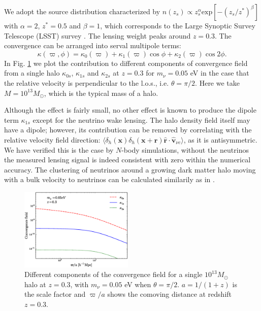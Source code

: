 \documentclass[aps,prl,twocolumn,showpacs,superscriptaddress,groupedaddress,nofootinbib]{revtex4}  %
\newcommand{\mr}{\mathrm}
\begin{document}
We adopt the source distribution characterized by 
$n(z_s)\propto z_s^\alpha\mr{exp}[-(z_s/z^*)^\beta]$ with $\alpha=2$, $z^*=0.5$
and $\beta=1$, which corresponds to the Large Synoptic Survey Telescope (LSST) 
survey \cite{Abell:2009}.
The lensing weight peaks around $z=0.3$.
The convergence can be arranged into serval multipole terms:
$$\kappa(\varpi,\phi)=\kappa_0(\varpi)+ \kappa_1
(\varpi)\cos\phi+\kappa_2(\varpi)\cos2\phi.$$ 
In Fig. \ref{fig:kappa} we plot the contribution to different components
of convergence field from a single halo $\kappa_{0s}$, $\kappa_{1s}$ and 
$\kappa_{2s}$ at $z=0.3$
for $m_\nu=0.05$ eV in the case that the relative velocity is
perpendicular to the l.o.s., i.e. $\theta=\pi/2$.
Here we take $M=10^{13}M_\odot$, which is the typical mass of a halo.

Although the effect is fairly small, no other effect is known to produce the dipole 
term $\kappa_{1s}$  except for the neutrino wake lensing.
The halo density field itself may have a dipole; however, its contribution 
can be removed by correlating with the relative velocity field 
direction: $\langle\delta_h(\bm x)\delta_h(\bm x + \bm r) \hat{\bm r}
\cdot\hat{\bm{v}}_{\nu c}\rangle$,  as it is antisymmetric.  We have
  verified this is the case by $N$-body simulations, without the neutrinos
the measured lensing signal is indeed consistent with zero within 
the numerical accuracy.
The clustering of neutrinos around a growing dark matter halo moving with
a bulk velocity to neutrinos can be calculated similarily as in
\cite{2014PhRvD..89f3502L}.


\begin{figure}[tbp]
\begin{center}
\includegraphics[width=0.48\textwidth]{fig_3.eps}
\end{center}
\vspace{-0.7cm}
\caption{\label{fig:kappa} Different components of the convergence field for 
a single $10^{13} M_\odot$ halo at $z=0.3$, with $m_\nu=0.05$ eV when 
$\theta=\pi/2$. $a=1/(1+z)$ is the scale factor and $\varpi/a$ shows the
comoving distance at redshift $z=0.3$.}
\end{figure}
\end{document}
